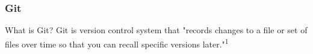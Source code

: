 \documentclass{beamer}
\begin{document}
\begin{frame}
    \centering
    \frametitle{Git}
    
    \begin{block}{What is Git?}
		Git is version control system that "records changes to a file or set of files over time so that you can recall specific versions later."\textsuperscript{1}
    \end{block}

\end{frame}
     
\end{document}
